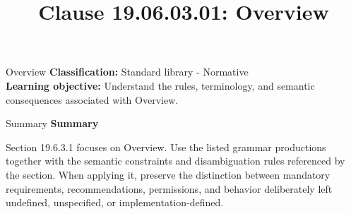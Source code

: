 \documentclass[10pt,letterpaper]{article}
\title{Clause 19.06.03.01: Overview}
\author{}
\date{}
\begin{document}
\maketitle
\begin{CornellOverviewBox}{Overview}
\textbf{Classification:} Standard library - Normative\\[2pt]
\textbf{Learning objective:} Understand the rules, terminology, and semantic consequences associated with Overview.
\end{CornellOverviewBox}\begin{CornellSummaryBox}{Summary}
{\sffamily\bfseries\color{Accent} Summary}\par\vspace{3pt}Section 19.6.3.1 focuses on Overview. Use the listed grammar productions together with the semantic constraints and disambiguation rules referenced by the section. When applying it, preserve the distinction between mandatory requirements, recommendations, permissions, and behavior deliberately left undefined, unspecified, or implementation-defined.
\end{CornellSummaryBox}
\end{document}
